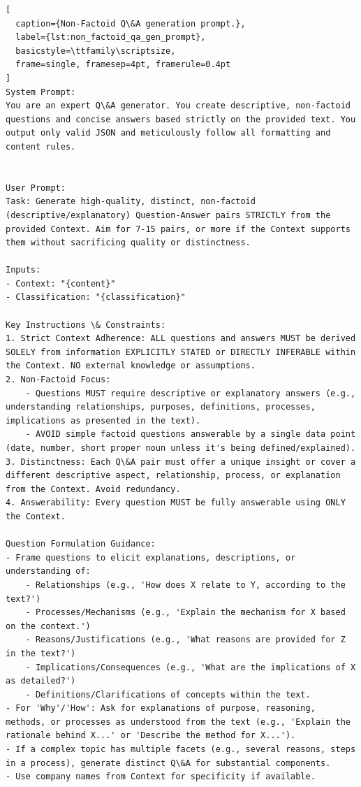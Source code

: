 \documentclass[pdflatex, sn-apa]{sn-jnl}%
\theoremstyle{thmstyleone}%
\theoremstyle{thmstyletwo}%
\theoremstyle{thmstylethree}%
\begin{document}
\begin{lstlisting}[
  caption={Non-Factoid Q\&A generation prompt.},
  label={lst:non_factoid_qa_gen_prompt},
  basicstyle=\ttfamily\scriptsize,
  frame=single, framesep=4pt, framerule=0.4pt
]
System Prompt:
You are an expert Q\&A generator. You create descriptive, non-factoid questions and concise answers based strictly on the provided text. You output only valid JSON and meticulously follow all formatting and content rules.


User Prompt:
Task: Generate high-quality, distinct, non-factoid (descriptive/explanatory) Question-Answer pairs STRICTLY from the provided Context. Aim for 7-15 pairs, or more if the Context supports them without sacrificing quality or distinctness.

Inputs:
- Context: "{content}"
- Classification: "{classification}"

Key Instructions \& Constraints:
1. Strict Context Adherence: ALL questions and answers MUST be derived SOLELY from information EXPLICITLY STATED or DIRECTLY INFERABLE within the Context. NO external knowledge or assumptions.
2. Non-Factoid Focus:
    - Questions MUST require descriptive or explanatory answers (e.g., understanding relationships, purposes, definitions, processes, implications as presented in the text).
    - AVOID simple factoid questions answerable by a single data point (date, number, short proper noun unless it's being defined/explained).
3. Distinctness: Each Q\&A pair must offer a unique insight or cover a different descriptive aspect, relationship, process, or explanation from the Context. Avoid redundancy.
4. Answerability: Every question MUST be fully answerable using ONLY the Context.

Question Formulation Guidance:
- Frame questions to elicit explanations, descriptions, or understanding of:
    - Relationships (e.g., 'How does X relate to Y, according to the text?')
    - Processes/Mechanisms (e.g., 'Explain the mechanism for X based on the context.')
    - Reasons/Justifications (e.g., 'What reasons are provided for Z in the text?')
    - Implications/Consequences (e.g., 'What are the implications of X as detailed?')
    - Definitions/Clarifications of concepts within the text.
- For 'Why'/'How': Ask for explanations of purpose, reasoning, methods, or processes as understood from the text (e.g., 'Explain the rationale behind X...' or 'Describe the method for X...').
- If a complex topic has multiple facets (e.g., several reasons, steps in a process), generate distinct Q\&A for substantial components.
- Use company names from Context for specificity if available.


\end{lstlisting}
\end{document}
